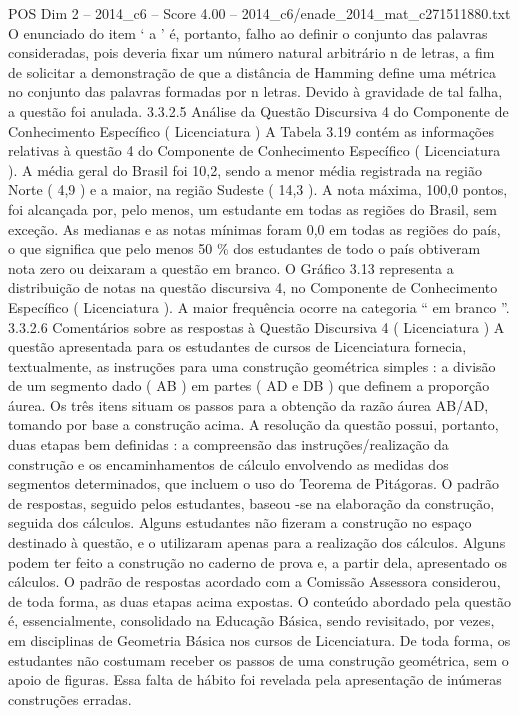 \begin{textsample}{POS Dim 2 – 2014\_c6 – Score 4.00 – 2014\_c6/enade\_2014\_mat\_c271511880.txt}
O enunciado do item ‘ a ’ é, portanto, falho ao definir o conjunto das palavras consideradas, pois deveria fixar um número natural arbitrário n de letras, a fim de solicitar a demonstração de que a distância de Hamming define uma métrica no conjunto das palavras formadas por n letras.
Devido à gravidade de tal falha, a questão foi anulada. 3.3.2.5 Análise da Questão Discursiva 4 do Componente de Conhecimento Específico ( Licenciatura ) A Tabela 3.19 contém as informações relativas à questão 4 do Componente de Conhecimento Específico ( Licenciatura ).
A média geral do Brasil foi 10,2, sendo a menor média registrada na região Norte ( 4,9 ) e a maior, na região Sudeste ( 14,3 ).
A nota máxima, 100,0 pontos, foi alcançada por, pelo menos, um estudante em todas as regiões do Brasil, sem exceção.
As medianas e as notas mínimas foram 0,0 em todas as regiões do país, o que significa que pelo menos 50 \% dos estudantes de todo o país obtiveram nota zero ou deixaram a questão em branco.
O Gráfico 3.13 representa a distribuição de notas na questão discursiva 4, no Componente de Conhecimento Específico ( Licenciatura ).
A maior frequência ocorre na categoria “ em branco ”. 3.3.2.6 Comentários sobre as respostas à Questão Discursiva 4 ( Licenciatura ) A questão apresentada para os estudantes de cursos de Licenciatura fornecia, textualmente, as instruções para uma construção geométrica simples : a divisão de um segmento dado ( AB ) em partes ( AD e DB ) que definem a proporção áurea.
Os três itens situam os passos para a obtenção da razão áurea AB/AD, tomando por base a construção acima.
A resolução da questão possui, portanto, duas etapas bem definidas : a compreensão das instruções/realização da construção e os encaminhamentos de cálculo envolvendo as medidas dos segmentos determinados, que incluem o uso do Teorema de Pitágoras.
O padrão de respostas, seguido pelos estudantes, baseou -se na elaboração da construção, seguida dos cálculos.
Alguns estudantes não fizeram a construção no espaço destinado à questão, e o utilizaram apenas para a realização dos cálculos.
Alguns podem ter feito a construção no caderno de prova e, a partir dela, apresentado os cálculos.
O padrão de respostas acordado com a Comissão Assessora considerou, de toda forma, as duas etapas acima expostas.
O conteúdo abordado pela questão é, essencialmente, consolidado na Educação Básica, sendo revisitado, por vezes, em disciplinas de Geometria Básica nos cursos de Licenciatura.
De toda forma, os estudantes não costumam receber os passos de uma construção geométrica, sem o apoio de figuras.
Essa falta de hábito foi revelada pela apresentação de inúmeras construções erradas.

\end{textsample}
